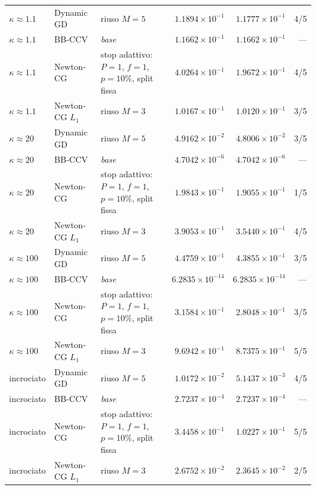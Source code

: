 \begin{table}[H]
\begin{tabular}{@{}llp{3.4cm}rrr@{}}
\midrule
$\kappa\approx 1.1$ & Dynamic GD & riuso $M{=}5$ & $1.1894\times10^{-1}$ & $1.1777\times10^{-1}$ & 4/5\\
$\kappa\approx 1.1$ & BB-CCV & \emph{base} & $1.1662\times10^{-1}$ & $1.1662\times10^{-1}$ & ---\\
$\kappa\approx 1.1$ & Newton-CG & stop adattivo: $P{=}1$, $f{=}1$, $p{=}10\%$, split fissa & $4.0264\times10^{-1}$ & $1.9672\times10^{-1}$ & 4/5\\
$\kappa\approx 1.1$ & Newton-CG $L_1$ & riuso $M{=}3$ & $1.0167\times10^{-1}$ & $1.0120\times10^{-1}$ & 3/5\\
\midrule
$\kappa\approx 20$ & Dynamic GD & riuso $M{=}5$ & $4.9162\times10^{-2}$ & $4.8006\times10^{-2}$ & 3/5\\
$\kappa\approx 20$ & BB-CCV & \emph{base} & $4.7042\times10^{-6}$ & $4.7042\times10^{-6}$ & ---\\
$\kappa\approx 20$ & Newton-CG & stop adattivo: $P{=}1$, $f{=}1$, $p{=}10\%$, split fissa & $1.9843\times10^{-1}$ & $1.9055\times10^{-1}$ & 1/5\\
$\kappa\approx 20$ & Newton-CG $L_1$ & riuso $M{=}3$ & $3.9053\times10^{-1}$ & $3.5440\times10^{-1}$ & 4/5\\
\midrule
$\kappa\approx 100$ & Dynamic GD & riuso $M{=}5$ & $4.4759\times10^{-1}$ & $4.3855\times10^{-1}$ & 3/5\\
$\kappa\approx 100$ & BB-CCV & \emph{base} & $6.2835\times10^{-14}$ & $6.2835\times10^{-14}$ & ---\\
$\kappa\approx 100$ & Newton-CG & stop adattivo: $P{=}1$, $f{=}1$, $p{=}10\%$, split fissa & $3.1584\times10^{-1}$ & $2.8048\times10^{-1}$ & 3/5\\
$\kappa\approx 100$ & Newton-CG $L_1$ & riuso $M{=}3$ & $9.6942\times10^{-1}$ & $8.7375\times10^{-1}$ & 5/5\\
\midrule
incrociato & Dynamic GD & riuso $M{=}5$ & $1.0172\times10^{-2}$ & $5.1437\times10^{-3}$ & 4/5\\
incrociato & BB-CCV & \emph{base} & $2.7237\times10^{-4}$ & $2.7237\times10^{-4}$ & ---\\
incrociato & Newton-CG & stop adattivo: $P{=}1$, $f{=}1$, $p{=}10\%$, split fissa & $3.4458\times10^{-1}$ & $1.0227\times10^{-1}$ & 5/5\\
incrociato & Newton-CG $L_1$ & riuso $M{=}3$ & $2.6752\times10^{-2}$ & $2.3645\times10^{-2}$ & 2/5\\
\bottomrule
\end{tabular}
\end{table}
